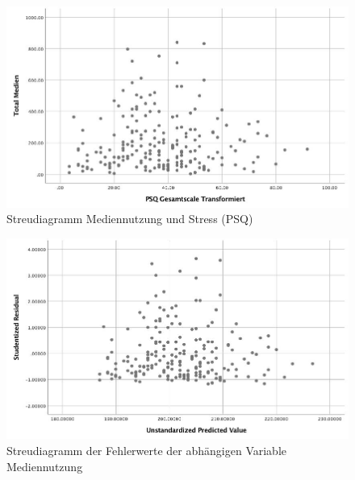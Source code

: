 
\begin{figure}[h]
  \centering
     \includegraphics[scale=0.4]{content/Grafik/Streudiagramm_TotalMedien_PSQ.jpg}
  \caption{Streudiagramm Mediennutzung und Stress (PSQ)}
  \label{fig:AppStreudiagrammMedienPsq}
\end{figure}

\begin{figure}[h]
  \centering
     \includegraphics[scale=0.4]{content/Grafik/Streudiagramm_Hypo2_GeschaetzteWerteUndResiduen.jpg}
  \caption{Streudiagramm der Fehlerwerte  der abhängigen Variable Mediennutzung}
  \label{fig:AppStreudiagrammResiduen}
\end{figure}

